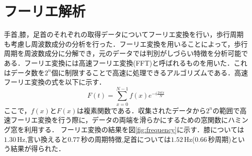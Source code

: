 \documentclass[a4j,10.5pt]{jreport}
\begin{document}
\section{フーリエ解析}
手首,膝，足首のそれぞれの取得データについてフーリエ変換を行い，歩行周期も考慮し周波数成分の分析を行った．フーリエ変換を用いることによって，歩行周期を周波数成分に分解でき，元のデータでは判別がしづらい特徴を分析可能である．フーリエ変換には高速フーリエ変換(FFT)と呼ばれるものを用いた．これはデータ数を$2^n$個に制限することで高速に処理できるアルゴリズムである．高速フーリエ変換の式を以下に示す．
\begin{equation}
    F(t)=\sum_{x=0}^{N-1}f(x)e^{-i\frac{2\pi tx}{N}}
\end{equation}
ここで，$f(x)$と$F(x)$は複素関数である．収集されたデータから$2^n$の範囲で高速フーリエ変換を行う際に，データの両端を滑らかにするための窓関数にハミング窓を利用する．
フーリエ変換の結果を図\ref{fig:frequency}に示す．膝については$1.30\,\mathrm{Hz} $,言い換えると$0.77\,\mathrm{秒}$の周期特徴,足首については$1.52\,\mathrm{Hz}$($0.66\,\mathrm{秒}$周期)という結果が得られた．
\end{document}
